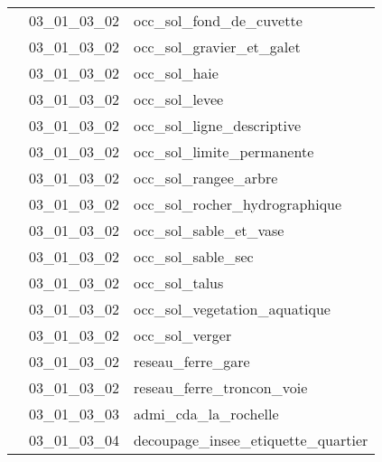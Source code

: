 \documentclass[12pt,titlepage,oneside]{book}
\begin{document}
\begin{supertabular}{|p{10cm}|c|p{15cm}|}
                    & 03\_01\_03\_02 & occ\_sol\_fond\_de\_cuvette\\


                    & 03\_01\_03\_02 & occ\_sol\_gravier\_et\_galet\\


                    & 03\_01\_03\_02 & occ\_sol\_haie\\


                    & 03\_01\_03\_02 & occ\_sol\_levee\\


                    & 03\_01\_03\_02 & occ\_sol\_ligne\_descriptive\\


                    & 03\_01\_03\_02 & occ\_sol\_limite\_permanente\\


                    & 03\_01\_03\_02 & occ\_sol\_rangee\_arbre\\


                    & 03\_01\_03\_02 & occ\_sol\_rocher\_hydrographique\\


                    & 03\_01\_03\_02 & occ\_sol\_sable\_et\_vase\\


                    & 03\_01\_03\_02 & occ\_sol\_sable\_sec\\


                    & 03\_01\_03\_02 & occ\_sol\_talus\\


                    & 03\_01\_03\_02 & occ\_sol\_vegetation\_aquatique\\


                    & 03\_01\_03\_02 & occ\_sol\_verger\\


                    & 03\_01\_03\_02 & reseau\_ferre\_gare\\


                    & 03\_01\_03\_02 & reseau\_ferre\_troncon\_voie\\


                    & 03\_01\_03\_03 & admi\_cda\_la\_rochelle\\


                    & 03\_01\_03\_04 & decoupage\_insee\_etiquette\_quartier\\



\end{supertabular}
\end{document}
